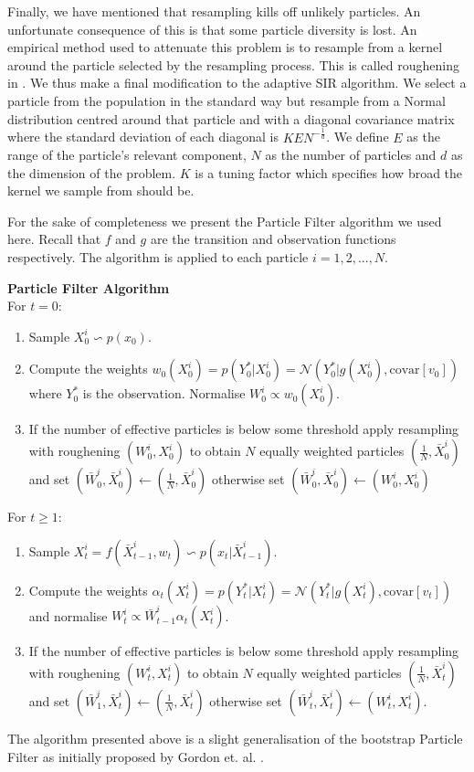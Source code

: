 Finally, we have mentioned that resampling kills off unlikely particles. An unfortunate consequence of this is that some particle diversity is lost. An empirical method used to attenuate this problem is to resample from a kernel around the particle selected by the resampling process. This is called roughening in \cite{gordon}. We thus make a final modification to the adaptive SIR algorithm. We select a particle from the population in the standard way but resample from a Normal distribution centred around that particle and with a diagonal covariance matrix where the standard deviation of each diagonal is $KEN^{-\frac{1}{d}}$. We define $E$ as the range of the particle's relevant component, $N$ as the number of particles and $d$ as the dimension of the problem. $K$ is a tuning factor which specifies how broad the kernel we sample from should be. 

For the sake of completeness we present the Particle Filter algorithm we used here. Recall that $f$ and $g$ are the transition and observation functions respectively. The algorithm is applied to each particle $i=1,2,...,N$.

\textbf{Particle Filter Algorithm}\\
For $t=0$:
\begin{enumerate}
\item
Sample $X^i_0 \backsim p(x_0)$.
\item
Compute the weights $w_0(X_0^i) = p(Y^*_0|X_0^i) = \mathcal{N}(Y^*_0|g(X^i_0), \text{covar}[v_0])$ where $Y^*_0$ is the observation. Normalise $W^i_0 \propto w_0(X^i_0)$.
\item
If the number of effective particles is below some threshold apply resampling with roughening $(W^i_0, X^i_0)$ to obtain $N$ equally weighted particles $(\frac{1}{N}, \bar{X}^i_0)$ and set $(\bar{W}^i_0, \bar{X}^i_0) \leftarrow (\frac{1}{N}, \bar{X}^i_0)$ otherwise set $(\bar{W}^i_0, \bar{X}^i_0) \leftarrow ({W}^i_0, {X}^i_0)$
\end{enumerate}
For $t \geq 1$:
\begin{enumerate}
\item
Sample $X^i_t = f(\bar{X}^i_{t-1}, w_t) \backsim p(x_t|\bar{X}^i_{t-1})$.
\item
Compute the weights $\alpha_t(X^i_{t}) = p(Y^*_t|X_t^i) = \mathcal{N}(Y^*_t|g(X^i_t), \text{covar}[v_t])$ and normalise $W^i_t \propto \bar{W}^i_{t-1}\alpha_t(X^i_{t})$.
\item
If the number of effective particles is below some threshold apply resampling with roughening $(W^i_t, X^i_{t})$ to obtain $N$ equally weighted particles $(\frac{1}{N}, \bar{X}^i_{t})$ and set $(\bar{W}^i_1, \bar{X}^i_t) \leftarrow (\frac{1}{N}, \bar{X}^i_t)$ otherwise set $(\bar{W}^i_t, \bar{X}^i_t) \leftarrow ({W}^i_t, {X}^i_t)$.
\end{enumerate}
The algorithm presented above is a slight generalisation of the bootstrap Particle Filter as initially proposed by Gordon et. al. \cite{gordon}.


